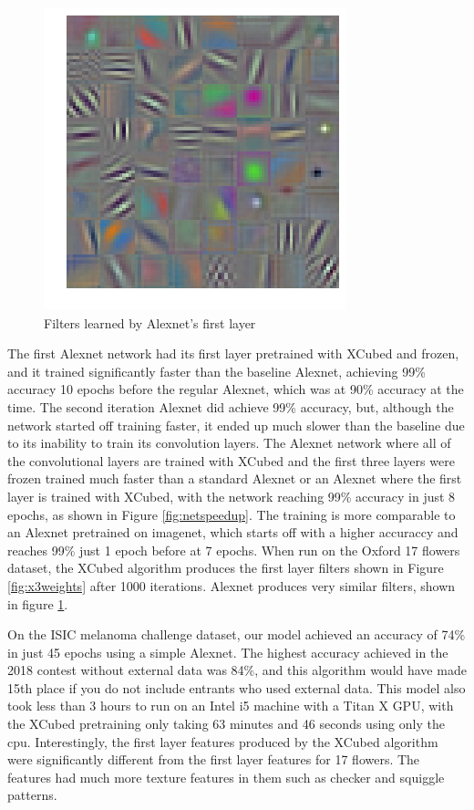 \documentclass{article}
\begin{document}
\begin{figure}
    \centering
    \includegraphics[width=.8\linewidth]{trainedfet}
    \caption{Filters learned by Alexnet's first layer}
    \label{fig:learnedweights}
\end{figure}
The first Alexnet network had its first layer pretrained with XCubed and frozen, and it trained significantly faster than the baseline Alexnet, achieving 99\% accuracy 10 epochs before the regular Alexnet, which was at 90\% accuracy at the time. The second iteration Alexnet did achieve 99\% accuracy, but, although the network started off training faster, it ended up much slower than the baseline due to its inability to train its convolution layers. The Alexnet network where all of the convolutional layers are trained with XCubed and the first three layers were frozen trained much faster than a standard Alexnet or an Alexnet where the first layer is trained with XCubed, with the network reaching 99\% accuracy in just 8 epochs, as shown in Figure \ref{fig:netspeedup}. The training is more comparable to an Alexnet pretrained on imagenet, which starts off with a higher accuraccy and reaches 99\% just 1 epoch before at 7 epochs. When run on the Oxford 17 flowers dataset, the XCubed algorithm produces the first layer filters shown in Figure \ref{fig:x3weights} after 1000 iterations. Alexnet produces very similar filters, shown in figure \ref{fig:learnedweights}.

On the ISIC melanoma challenge dataset, our model achieved an accuracy of 74\% in just 45 epochs using a simple Alexnet. The highest accuracy achieved in the 2018 contest without external data was 84\%, and this algorithm would have made 15th place if you do not include entrants who used external data. This model also took less than 3 hours to run on an Intel i5 machine with a Titan X GPU, with the XCubed pretraining only taking 63 minutes and 46 seconds using only the cpu. Interestingly, the first layer features produced by the XCubed algorithm were significantly different from the first layer features for 17 flowers. The features had much more texture features in them such as checker and squiggle patterns.
\end{document}
